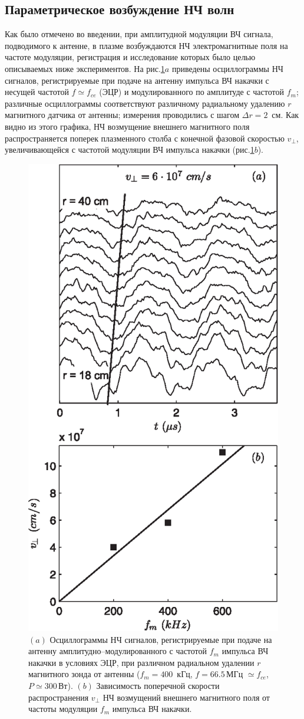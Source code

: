 \documentclass[autoref,10pt]{disser}
\begin{document}
\subsection{Параметрическое возбуждение НЧ волн}
Как было отмечено во введении, при амплитудной модуляции ВЧ сигнала, подводимого к антенне, в плазме возбуждаются НЧ электромагнитные поля на частоте модуляции, регистрация и исследование которых было целью описываемых ниже экспериментов.
На \mbox{рис.\ref{fig:phase_composite}$a$} приведены  осциллограммы НЧ сигналов, регистрируемые при подаче на антенну импульса ВЧ накачки с несущей частотой $f\simeq{}f_{ce}$ (ЭЦР) и модулированного по амплитуде с частотой $f_{m}$; различные осциллограммы соответствуют различному радиальному удалению $r$ магнитного датчика от антенны; измерения проводились с шагом $\Delta{}r = 2$~см. Как видно из этого графика, НЧ возмущение внешнего магнитного поля распространяется поперек плазменного столба с конечной фазовой скоростью $v_{\perp}$, увеличивающейся с частотой модуляции ВЧ импульса накачки (\mbox{рис.\ref{fig:phase_composite}$b$}).
\begin{figure}[H]
        \centering
        \includegraphics[width=0.5\columnwidth]{pics/phase_composite.eps}
        \caption{$(a)$ Осциллограммы НЧ сигналов, регистрируемые при подаче на антенну амплитудно--модулированного с частотой $f_{m}$ импульса ВЧ накачки в условиях ЭЦР, при различном радиальном удалении $r$ магнитного зонда от антенны ($f_{m} = 400$\, кГц, $f=66.5$\,МГц $\simeq f_{ce}$, $P\simeq 300$\,Вт). $(b)$ Зависимость поперечной скорости распространения $v_{\perp}$ НЧ возмущений внешнего магнитного поля от частоты модуляции $f_{m}$ импульса ВЧ накачки.}
        \label{fig:phase_composite}
\end{figure} 
\end{document}
